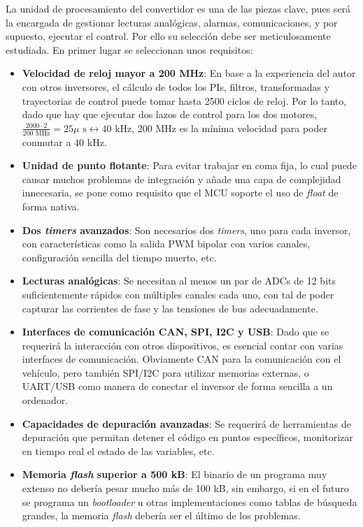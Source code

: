 La unidad de procesamiento del convertidor es una de las piezas clave, pues será la encargada de gestionar lecturas analógicas, alarmas, comunicaciones, y por supuesto, ejecutar el control. Por ello su selección debe ser meticulosamente estudiada. En primer lugar se seleccionan unos requisitos:

\begin{itemize}
	\item \textbf{Velocidad de reloj mayor a 200 MHz}: En base a la experiencia del autor con otros inversores, el cálculo de todos los PIs, filtros, transformadas y trayectorias de control puede tomar hasta 2500 ciclos de reloj. Por lo tanto, dado que hay que ejecutar dos lazos de control para los dos motores, $\frac{2000 \cdot 2}{200 \text{ MHz}} = 25 \mu\text{ s} \leftrightarrow 40 \text{ kHz}$, 200 MHz es la mínima velocidad para poder conmutar a 40 kHz.
	\item \textbf{Unidad de punto flotante}: Para evitar trabajar en coma fija, lo cual puede causar muchos problemas de integración y añade una capa de complejidad innecesaria, se pone como requisito que el MCU soporte el uso de \textit{float} de forma nativa.
	\item \textbf{Dos \textit{timers} avanzados}: Son necesarios dos \textit{timers}, uno para cada inversor, con características como la salida PWM bipolar con varios canales, configuración sencilla del tiempo muerto, etc.
	\item \textbf{Lecturas analógicas}: Se necesitan al menos un par de ADCs de 12 bits suficientemente rápidos con múltiples canales cada uno, con tal de poder capturar las corrientes de fase y las tensiones de bus adecuadamente.
	\item \textbf{Interfaces de comunicación CAN, SPI, I2C y USB}: Dado que se requerirá la interacción con otros dispositivos, es esencial contar con varias interfaces de comunicación. Obviamente CAN para la comunicación con el vehículo, pero también SPI/I2C para utilizar memorias externas, o UART/USB como manera de conectar el inversor de forma sencilla a un ordenador.
	\item \textbf{Capacidades de depuración avanzadas}: Se requerirá de herramientas de depuración que permitan detener el código en puntos específicos, monitorizar en tiempo real el estado de las variables, etc.
	\item \textbf{Memoria \textit{flash} superior a 500 kB}: El binario de un programa muy extenso no debería pesar mucho más de 100 kB, sin embargo, si en el futuro se programa un \textit{bootloader} u otras implementaciones como tablas de búsqueda grandes, la memoria \textit{flash} debería ser el último de los problemas.
	
\end{itemize}

